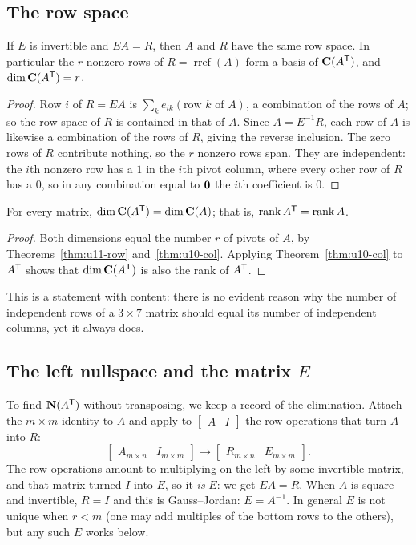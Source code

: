 \subsection{The row space}

\begin{theorem}\label{thm:u11-row}
If $E$ is invertible and $EA=R$, then $A$ and $R$ have the same row space. In particular the $r$
nonzero rows of $R=\operatorname{rref}(A)$ form a basis of $\mathbf{C}(A^{\mathsf{T}})$, and $\dim\mathbf{C}(A^{\mathsf{T}})=r$.
\end{theorem}
\begin{proof}
Row $i$ of $R=EA$ is $\sum_k e_{ik}(\text{row }k\text{ of }A)$, a combination of the rows of $A$;
so the row space of $R$ is contained in that of $A$. Since $A=E^{-1}R$, each row of $A$ is likewise a
combination of the rows of $R$, giving the reverse inclusion. The zero rows of $R$ contribute
nothing, so the $r$ nonzero rows span. They are independent: the $i$th nonzero row has a $1$ in the
$i$th pivot column, where every other row of $R$ has a $0$, so in any combination equal to
$\boldsymbol{0}$ the $i$th coefficient is $0$.
\end{proof}

\begin{corollary}\label{cor:u11-rankT}
For every matrix, $\dim\mathbf{C}(A^{\mathsf{T}})=\dim\mathbf{C}(A)$; that is, $\operatorname{rank} A^{\mathsf{T}}=\operatorname{rank} A$.
\end{corollary}
\begin{proof}
Both dimensions equal the number $r$ of pivots of $A$, by Theorems~\ref{thm:u11-row}
and~\ref{thm:u10-col}. Applying Theorem~\ref{thm:u10-col} to $A^{\mathsf{T}}$ shows that $\dim\mathbf{C}(A^{\mathsf{T}})$ is
also the rank of $A^{\mathsf{T}}$.
\end{proof}

This is a statement with content: there is no evident reason why the number of independent rows of
a $3\times 7$ matrix should equal its number of independent columns, yet it always does.

\subsection{The left nullspace and the matrix \texorpdfstring{\(E\)}{E}}

To find $\mathbf{N}(A^{\mathsf{T}})$ without transposing, we keep a record of the elimination. Attach the $m\times m$
identity to $A$ and apply to $\begin{bmatrix}A&I\end{bmatrix}$ the row operations that turn $A$
into $R$:
\[
\begin{bmatrix}A_{m\times n}&I_{m\times m}\end{bmatrix}\longrightarrow
\begin{bmatrix}R_{m\times n}&E_{m\times m}\end{bmatrix}.
\]
The row operations amount to multiplying on the left by some invertible matrix, and that matrix
turned $I$ into $E$, so it \emph{is} $E$: we get $EA=R$. When $A$ is square and invertible, $R=I$
and this is Gauss--Jordan: $E=A^{-1}$. In general $E$ is not unique when $r<m$ (one may add
multiples of the bottom rows to the others), but any such $E$ works below.

